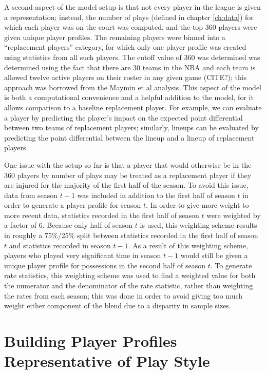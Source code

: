 A second aspect of the model setup is that not every player in the league is given a
representation; instead, the number of plays (defined in chapter \ref{ch:data}) for
which each player was on the court was computed, and the top 360 players were given
unique player profiles. The remaining players were binned into a ``replacement
players'' category, for which only one player profile was created using statistics
from all such players. The cutoff value of 360 was determined was determined using
the fact that there are 30 teams in the NBA and each team is allowed twelve active
players on their roster in any given game (CITE?); this approach was borrowed from
the Maymin et al analysis. This aspect of the model is both a computational
convenience and a helpful addition to the model, for it allows comparison to a
baseline replacement player. For example, we can evaluate a player by predicting the
player's impact on the expected point differential between two teams of replacement
players; similarly, lineups can be evaluated by predicting the point differential
between the lineup and a lineup of replacement players.

One issue with the setup so far is that a player that would otherwise be in the 360
players by number of plays may be treated as a replacement player if they are
injured for the majority of the first half of the season. To avoid this issue, data
from season $t-1$ was included in addition to the first half of season $t$ in order
to generate a player profile for season $t$. In order to give more weight to more
recent data, statistics recorded in the first half of season $t$ were weighted by a
factor of 6. Because only half of season $t$ is used, this weighting scheme results
in roughly a 75\%/25\% split between statistics recorded in the first half of season
$t$ and statistics recorded in season $t-1$. As a result of this weighting scheme,
players who played very significant time in season $t-1$ would still be given a
unique player profile for possessions in the second half of season $t$. To generate
rate statistics, this weighting scheme was used to find a weighted value for both
the numerator and the denominator of the rate statistic, rather than weighting the
rates from each season; this was done in order to avoid giving too much weight
either component of the blend due to a disparity in sample sizes.

\section{Building Player Profiles Representative of Play Style}
\label{sec:profiles}

